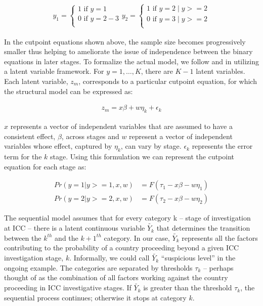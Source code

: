 \begin{eqnarray}
	y_{1} =
	\begin{cases}
		1 \text{ if } y = 1 \nonumber \\
		0 \text{ if } y = 2-3 \nonumber \\
	\end{cases}
	y_{2} =
	\begin{cases}
		1 \text{ if } y = 2 \; | \; y >= 2 \nonumber \\
		0 \text{ if } y = 3 \; | \; y >= 2 \nonumber \\
	\end{cases}
\end{eqnarray}

In the cutpoint equations shown above, the sample size becomes progressively smaller thus helping to ameliorate the issue of independence between the binary equations in later stages. To formalize the actual model, we follow \citet{tutz1990sequential} and \citet{agresti:2010} in utilizing a latent variable framework. For $y=1,\ldots,K$, there are $K-1$ latent variables. Each latent variable, $z_{m}$, corresponds to a particular cutpoint equation, for which the structural model can be expressed as:

\begin{align}
	z_{m} = x \beta + w\eta_{k}  + \epsilon_{k}
\end{align}

$x$ represents a vector of independent variables that are assumed to have a consistent effect, $\beta$, across stages and $w$ represent a vector of independent variables whose effect, captured by $\eta_{k}$, can vary by stage. $\epsilon_{k}$ represents the error term for the $k$ stage. Using this formulation we can represent the cutpoint equation for each stage as:

\begin{align}
	Pr(y = 1 | y >= 1, x, w) &= F(\tau_{1} - x\beta - w\eta_{1}) \\
	Pr(y = 2 | y >= 2, x, w) &= F(\tau_{2} - x\beta - w\eta_{2})
\end{align}

The sequential model assumes that for every category k -- stage of investigation at ICC -- there is a latent continuous variable $\tilde{Y_{k}}$ that determines the transition between the $k^{th}$ and the $k+1^{th}$ category. In our case, $\tilde{Y_{k}}$ represents all the factors contributing to the probability of a country proceeding beyond a given ICC investigation stage, $k$. Informally, we could call $\tilde{Y_{k}}$ ``suspicious level'' in the ongoing example. The categories are separated by thresholds $\tau_{k}$ -- perhaps thought of as the combination of all factors working against the country proceeding in ICC investigative stages. If $\tilde{Y_{k}}$ is greater than the threshold $\tau_{k}$, the sequential process continues; otherwise it stops at category $k$.

